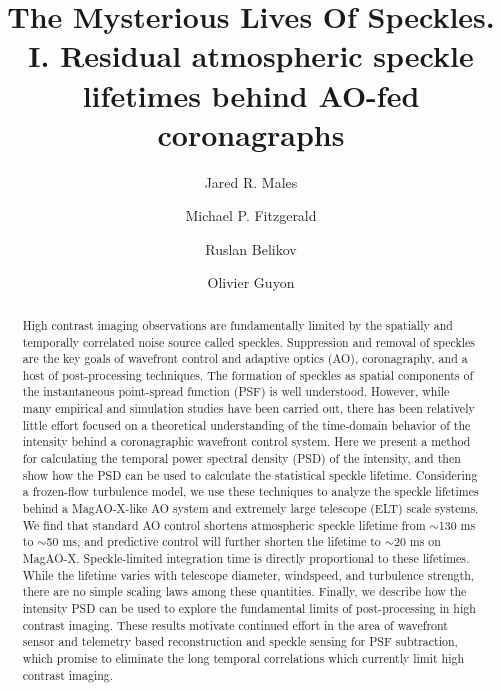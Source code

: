 \documentclass[10pt,preprint]{aastex631}
\begin{document}
\title{The Mysterious Lives Of Speckles. I. Residual atmospheric speckle lifetimes behind AO-fed coronagraphs}

\author{Jared R. Males}

\author{Michael P. Fitzgerald}

\author{Ruslan Belikov}

\author{Olivier Guyon}

\begin{abstract}
High contrast imaging observations are fundamentally limited by the spatially and temporally correlated noise source called speckles.  Suppression and removal of speckles are the key goals of wavefront control and adaptive optics (AO), coronagraphy, and a host of post-processing techniques.   The formation of speckles as spatial components of the instantaneous point-spread function (PSF) is well understood. However, while many empirical and simulation studies have been carried out, there has been relatively little effort focused on a theoretical understanding of the time-domain behavior of the intensity behind a coronagraphic wavefront control system.  Here we present a method for calculating the temporal power spectral density (PSD) of the intensity, and then show how the PSD can be used to calculate the statistical speckle lifetime.  Considering a frozen-flow turbulence model, we use these techniques to analyze the speckle lifetimes behind a MagAO-X-like AO system and extremely large telescope (ELT) scale systems.   We find that standard AO control shortens atmospheric speckle lifetime from $\sim$130 ms to $\sim$50 ms, and predictive control will further shorten the lifetime to $\sim$20 ms on MagAO-X.  Speckle-limited integration time is directly proportional to these lifetimes.  While the lifetime varies with telescope diameter, windspeed, and turbulence strength, there are no simple scaling laws among these quantities.   Finally, we describe how the intensity PSD can be used to explore the fundamental limits of post-processing in high contrast imaging.  These results motivate continued effort in the area of wavefront sensor and telemetry based reconstruction and speckle sensing for PSF subtraction, which promise to eliminate the long temporal correlations which currently limit high contrast imaging.
\end{abstract}
\end{document}
